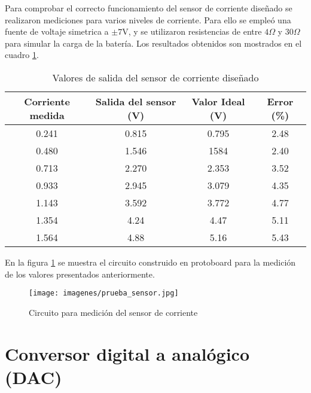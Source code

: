     Para comprobar el correcto funcionamiento del sensor de corriente diseñado
    se realizaron mediciones para varios niveles de corriente. Para ello se
    empleó una fuente de voltaje simetrica a $\pm7\text{V}$, y se utilizaron resistencias de entre 
    $4\Omega$ y $30\Omega$ para simular la carga de la batería. Los resultados 
    obtenidos son mostrados en el cuadro \ref{tb:mediciones_sensor}. 

\begin{table}[H]
    \centering
    \begin{tabular}{|c|c|c|c|}
        \hline
    Corriente medida & Salida del sensor (V) & Valor Ideal (V) & Error (\%) \\
    \hline
    0.241            & 0.815                 & 0.795           & 2.48       \\
    0.480            & 1.546                 & 1584            & 2.40       \\
    0.713            & 2.270                 & 2.353           & 3.52       \\
    0.933            & 2.945                 & 3.079           & 4.35       \\
    1.143            & 3.592                 & 3.772           & 4.77       \\
    1.354            & 4.24                  & 4.47            & 5.11       \\
    1.564            & 4.88                  & 5.16            & 5.43 \\
     \hline     
    \end{tabular}

    \caption{Valores de salida del sensor de corriente diseñado}
    \label{tb:mediciones_sensor}
    \end{table}


    En la figura \ref{fig:mediciones_sensor} se muestra el circuito construido
    en protoboard para la medición de los valores presentados anteriormente.

    \begin{figure}[H]
        \centering
        \texttt{[image: imagenes/prueba\_sensor.jpg]}
        \caption{Circuito para medición del sensor de corriente}
        \label{fig:mediciones_sensor}
    \end{figure}


\section{Conversor digital a analógico (DAC)}

